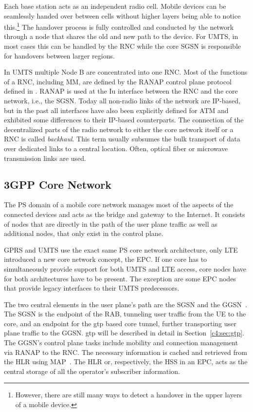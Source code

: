 Each base station acts as an independent radio cell. Mobile devices can be seamlessly handed over between cells without higher layers being able to notice this.\footnote{However, there are still many ways to detect a handover in the upper layers of a mobile device.} The handover process is fully controlled and conducted by the network through a node that shares the old and new path to the device. For \gls{UMTS}, in most cases this can be handled by the \gls{RNC} while the core \gls{SGSN} is responsible for handovers between larger regions.

In \gls{UMTS} multiple Node B are concentrated into one \gls{RNC}. Most of the functions of a \gls{RNC}, including \gls{MM}, are defined by the \gls{RANAP} control plane protocol defined in \cite{3gpp.25.413}. \gls{RANAP} is used at the Iu interface between the \gls{RNC} and the core network, i.e., the \gls{SGSN}. Today all non-radio links of the network are \gls{IP}-based, but in the past all interfaces have also been explicitly defined for \gls{ATM} and exhibited some differences to their \gls{IP}-based counterparts. The connection of the decentralized parts of the radio network to either the core network itself or a \gls{RNC} is called \textit{backhaul}. This term usually subsumes the bulk transport of data over dedicated links to a central location. Often, optical fiber or microwave transmission links are used.


\subsection{\texorpdfstring{\acrshort{3GPP}}{3GPP} Core Network}

The \gls{PS} domain of a mobile core network manages most of the aspects of the connected devices and acts as the bridge and gateway to the Internet. It consists of nodes that are directly in the path of the user plane traffic as well as additional nodes, that only exist in the control plane.

\gls{GPRS} and \gls{UMTS} use the exact same \gls{PS} core network architecture, only \gls{LTE} introduced a new core network concept, the \gls{EPC}. If one core has to simultaneously provide support for both \gls{UMTS} and \gls{LTE} access, core nodes have for both architectures have to be present. The exception are some \gls{EPC} nodes that provide legacy interfaces to their \gls{UMTS} predecessors.

The two central elements in the user plane's path are the \gls{SGSN} and the \gls{GGSN}~\cite{3gpp.22.060,3gpp.23.060}. The \gls{SGSN} is the endpoint of the \gls{RAB}, tunneling user traffic from the \gls{UE} to the core, and an endpoint for the \gls{gtp} based core tunnel, further transporting user plane traffic to the \gls{GGSN}. \Gls{gtp} will be described in detail in Section~\ref{c4:sec:gtp}. The \gls{GGSN}'s control plane tasks include mobility and connection management via \gls{RANAP} to the \gls{RNC}. The necessary information is cached and retrieved from the \gls{HLR}  using \gls{MAP}~\cite{3gpp.29.002}. The \gls{HLR} or, respectively, the \gls{HSS} in an \gls{EPC}, acts as the central storage of all the operator's subscriber information.

